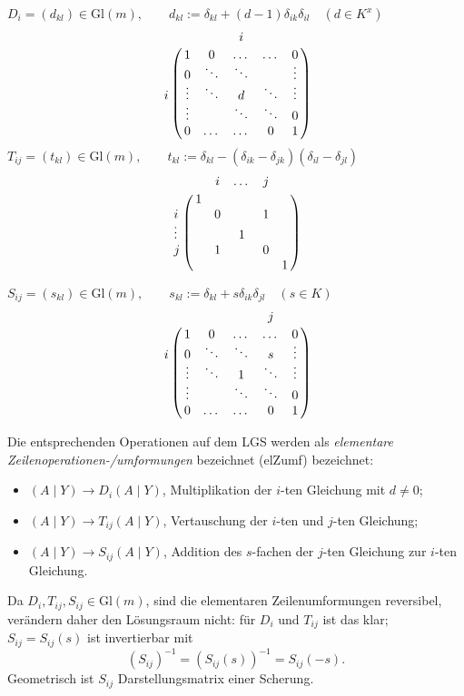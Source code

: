  	$ D_i = (d_{kl})\in \mathrm{Gl}(m), \qquad
 	d_{kl} := \delta_{kl}+(d-1)\delta_{ik}\delta_{il}\quad (d\in K^x) $
 	\[
 		\bordermatrix{
 			&   &   & i & &\cr
 			& 1 & 0 & \dots & \dots & 0\cr
 			& 0 & \ddots & \ddots &   & \vdots \cr
 			i & \vdots & \ddots & d & \ddots & \vdots \cr
 			& \vdots &   &  \ddots & \ddots & 0 \cr
 			& 0 &  \dots & \dots  & 0 & 1 \cr
 		}
 	\]
 	$ T_{ij} = (t_{kl})\in \mathrm{Gl}(m), \qquad
 	t_{kl} := \delta_{kl}-(\delta_{ik}-\delta_{jk})(\delta_{il}-\delta_{jl})$
 	\[
 		\bordermatrix{
 			&        & i      & \dots  & j     &         \cr
 			& 1      &        &        &       &         \cr
 			i     &        & 0      &        & 1     &         \cr
 			\vdots&        &        & 1      &       &         \cr
 			j     &        & 1      &        & 0     &         \cr
 			&        &        &        &       & 1       \cr
 		}
 	\]

 	$ S_{ij}=(s_{kl})\in \mathrm{Gl}(m), \qquad
 	s_{kl} := \delta_{kl}+s\delta_{ik}\delta_{jl} \quad (s\in K)$
 	\[
 		\bordermatrix{
 			&   &   &  & j &\cr
 			& 1 & 0 & \dots & \dots & 0\cr
 			i & 0 & \ddots & \ddots & s & \vdots \cr
 			& \vdots & \ddots & 1 & \ddots & \vdots \cr
 			& \vdots &   &  \ddots & \ddots & 0 \cr
 			& 0 &  \dots & \dots  & 0 & 1 \cr
 		}
 	\]

 	Die entsprechenden Operationen auf dem LGS werden als \emph{elementare Zeilenoperationen-/umformungen} bezeichnet (elZumf) bezeichnet:
 	\begin{itemize}
 		\item $ (A\mid Y) \to D_i (A\mid Y) $, Multiplikation der $ i $-ten Gleichung mit $ d\neq 0 $;
 		\item $ (A\mid Y) \to T_{ij} (A\mid Y) $, Vertauschung der $ i $-ten und $ j $-ten Gleichung;
 		\item $ (A\mid Y) \to S_{ij} (A\mid Y)$, Addition des $ s $-fachen der $ j $-ten Gleichung zur $ i $-ten Gleichung.
 	\end{itemize}
 	Da $ D_i,T_{ij},S_{ij}\in \mathrm{Gl}(m) $, sind die elementaren Zeilenumformungen reversibel, verändern daher den Lösungsraum nicht: für $ D_i $ und $ T_{ij} $ ist das klar; $ S_{ij} = S_{ij}(s) $ ist invertierbar mit
 	\[
 		(S_{ij})^{-1} = (S_{ij}(s))^{-1} = S_{ij}(-s).
 	\]
 	Geometrisch ist $ S_{ij} $ Darstellungsmatrix einer Scherung.

